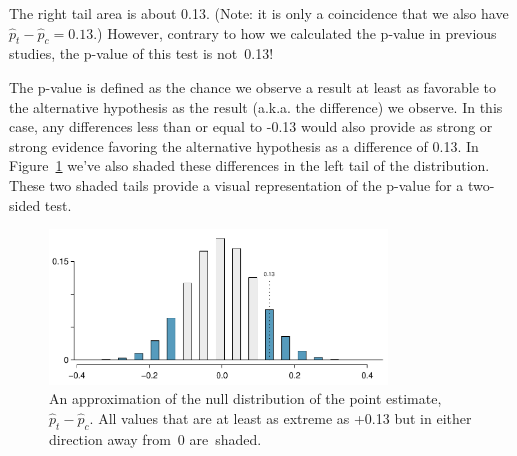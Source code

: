 The right tail area is about 0.13. (Note: it is only a coincidence that we also have $\hat{p}_t - \hat{p}_c=0.13$.) However, contrary to how we calculated the p-value in previous studies, the p-value of this test is not~0.13!

The p-value is defined as the chance we observe a result at least as favorable to the alternative hypothesis as the result (a.k.a. the difference) we observe. In this case, any differences less than or equal to -0.13 would also provide as strong or strong evidence favoring the alternative hypothesis as a difference of 0.13. In Figure~\ref{CPR_study_p_value} we've also shaded these differences in the left tail of the distribution. These two shaded tails provide a visual representation of the p-value for a two-sided test.


\begin{figure}[ht]
\centering
\includegraphics[width=0.8\textwidth]{02/figures/CPR_study/CPR_study_p_value}
\caption{An approximation of the null distribution of the point estimate, $\hat{p}_t - \hat{p}_c$. All values that are at least as extreme as +0.13 but in either direction away from~0 are~shaded.}
\label{CPR_study_p_value}
\end{figure}

